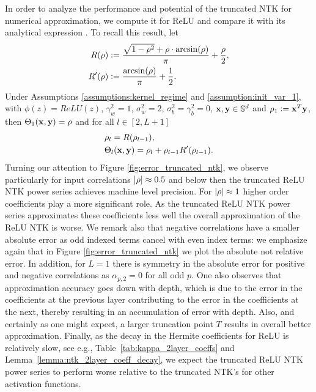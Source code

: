 In order to analyze the performance and potential of the truncated NTK for numerical approximation, we compute it for ReLU and compare it with its analytical expression \cite{arora_exact_comp}. To recall this result, let
\[
\begin{aligned}
    R(\rho) &\vcentcolon= \frac{\sqrt{1-\rho^2} + \rho \cdot \arcsin(\rho)}{\pi} + \frac{\rho}{2},\\
    R'(\rho) &\vcentcolon= \frac{\arcsin(\rho)}{\pi} + \frac{1}{2}.
\end{aligned}
\]
Under Assumptions \ref{assumptions:kernel_regime} and \ref{assumption:init_var_1}, with $\phi(z) = ReLU(z)$, $\gamma_w^2 = 1$, $\sigma_w^2 = 2$, $\sigma_b^2 = \gamma_b^2 = 0$, $\mathbf x, \mathbf y \in \mathbb{S}^d$ and $\rho_1 \vcentcolon= \mathbf x^T\mathbf y$, then $\Theta_1(\mathbf x,\mathbf y) = \rho$ and for all $l \in [2,L+1]$
\begin{equation}
    \begin{aligned}
        &\rho_l = R(\rho_{l-1}),\\
        &\Theta_l(\mathbf x, \mathbf y) = \rho_l + \rho_{l-1}R'(\rho_{l-1}).
    \end{aligned}
\end{equation}
Turning our attention to Figure \ref{fig:error_truncated_ntk}, we observe particularly for input correlations $\left\lvert\rho\right\rvert \approx 0.5$ and below then the truncated ReLU NTK power series achieves machine level precision. For $\left\lvert\rho\right\rvert \approx 1$ higher order coefficients play a more significant role. As the truncated ReLU NTK power series approximates these coefficients less well the overall approximation of the ReLU NTK is worse. We remark also that negative correlations have a smaller absolute error as odd indexed terms cancel with even index terms: we emphasize again that in Figure \ref{fig:error_truncated_ntk} we plot the absolute not relative error. In addition, for $L=1$ there is symmetry in the absolute error for positive and negative correlations as $\alpha_{p,2} = 0$ for all odd $p$. One also observes that approximation accuracy goes down with depth, which is due to the error in the coefficients at the previous layer contributing to the error in the coefficients at the next, thereby resulting in an accumulation of error with depth. Also, and certainly as one might expect, a larger truncation point $T$ results in overall better approximation. Finally, as the decay in the Hermite coefficients for ReLU is relatively slow, see e.g., Table~\ref{tab:kappa_2layer_coeffs} and Lemma~\ref{lemma:ntk_2layer_coeff_decay}, we expect the truncated ReLU NTK power series to perform worse relative to the truncated NTK's for other activation functions.

